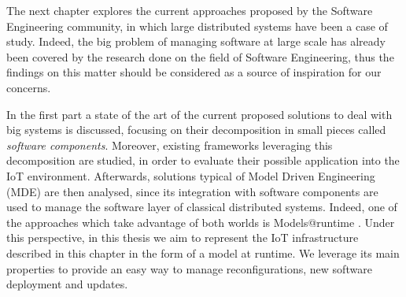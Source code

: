 The next chapter explores the current approaches proposed by the Software Engineering community, in which large distributed systems have been a case of study.
Indeed, the big problem of managing software at large scale has already been covered by the research done on the field of Software Engineering, thus the findings on this matter should be considered as a source of inspiration for our concerns.

In the first part a state of the art of the current proposed solutions to deal with big systems is discussed, focusing on their decomposition in small pieces called \textit{software components}.
Moreover, existing frameworks leveraging this decomposition are studied, in order to evaluate their possible application into the IoT environment.
Afterwards, solutions typical of Model Driven Engineering (MDE) are then analysed, since its integration with software components are used to manage the software layer of classical distributed systems.
Indeed, one of the approaches which take advantage of both worlds is Models@runtime \cite{morin2009mar}.
Under this perspective, in this thesis we aim to represent the IoT infrastructure described in this chapter in the form of a model at runtime.
We leverage its main properties to provide an easy way to manage reconfigurations, new software deployment and updates.





